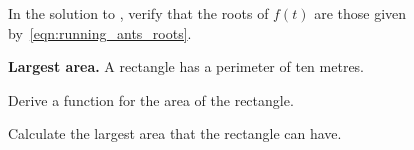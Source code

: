 \documentclass[a4paper,oneside,12pt]{article}
\begin{document}
\begin{exercise}
In the solution to , verify that the roots of
$f(t)$ are those given by~\eqref{eqn:running_ants_roots}.
\end{exercise}

\begin{example}
\textbf{Largest area.}
A rectangle has a perimeter of ten metres.
\begin{packedenum}
\item\label{subex:largest_area_perimeter_area}
  Derive a function for the area of the rectangle.

\item\label{subex:largest_area_of_rectangle}
  Calculate the largest area that the rectangle can have.
\end{packedenum}
\end{example}
\end{document}
